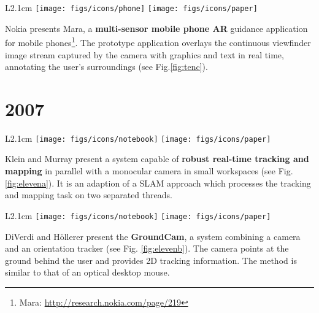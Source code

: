 \documentclass[12pt,a4paper]{article}
\begin{document}
\begin{wrapfigure}{L}{2.1cm}
	\vspace{-15pt}	
	\texttt{[image: figs/icons/phone]}
	\texttt{[image: figs/icons/paper]}	
	\vspace{-25pt}		
\end{wrapfigure}
\noindent Nokia presents Mara, a \textbf{multi-sensor mobile phone AR} guidance application for mobile phones\footnote{Mara: \url{http://research.nokia.com/page/219}}. The prototype application overlays the continuous viewfinder image stream captured by the camera with graphics and text in real time, annotating the user's surroundings (see Fig.\ref{fig:tenc}).

\newpage

\vspace{-5pt} 
\section*{2007}

\begin{wrapfigure}{L}{2.1cm}
	\vspace{-10pt}	
	\texttt{[image: figs/icons/notebook]}
	\texttt{[image: figs/icons/paper]}	
	\vspace{-20pt}		
\end{wrapfigure}
Klein and Murray present a system capable of \textbf{robust real-time tracking and mapping} in parallel with a monocular camera in small workspaces \cite{Klein07} (see Fig. \ref{fig:elevena}). It is an adaption of a SLAM approach which processes the tracking and mapping task on two separated threads.

\vspace{0.1in}

\begin{wrapfigure}{L}{2.1cm}
	\vspace{-10pt}	
	\texttt{[image: figs/icons/notebook]}
	\texttt{[image: figs/icons/paper]}	
	\vspace{-20pt}		
\end{wrapfigure}
\noindent DiVerdi and H\"ollerer present the \textbf{GroundCam}, a system combining a camera and an orientation tracker \cite{DiVerdi07} (see Fig. \ref{fig:elevenb}). The camera points at the ground behind the user and provides 2D tracking information. The method is similar to that of an optical desktop mouse. 
\end{document}
